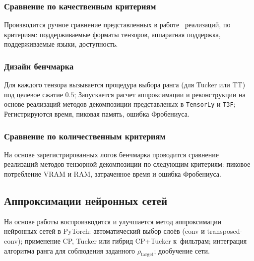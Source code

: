 \subsubsection*{Сравнение по качественным критериям}
Производится ручное сравнение представленных в работе~\cite{tensor_software_landscape} реализаций, по критериям: поддерживаемые форматы тензоров, аппаратная поддержка, поддерживаемые языки, доступность.

\subsubsection*{Дизайн бенчмарка}
Для каждого тензора вызывается процедура выбора ранга (для Tucker или TT) под целевое сжатие $0.5$; Запускается расчет аппроксимации и реконструкции на основе реализаций методов декомпозиции представленых в \texttt{TensorLy} и \texttt{T3F}; Регистрируются время, пиковая память, ошибка Фробениуса.

\subsubsection*{Сравнение по количественным критериям}
На основе зарегистрированных логов бенчмарка проводится сравнение реализаций методов тензорной декомпозиции по следующим критериям: пиковое потребление VRAM и RAM, затраченное время и ошибка Фробениуса.

\subsection*{Аппроксимации нейронных сетей}
На основе работы \cite{stable_low_rank_tensor_decomposition} воспроизводится и улучшается метод аппроксимации нейронных сетей в PyTorch: автоматический выбор слоёв (conv и transposed-conv); применение CP, Tucker или гибрид CP+Tucker к~фильтрам; интеграция алгоритма ранга для соблюдения заданного $\rho_{\text{target}}$; дообучение сети.